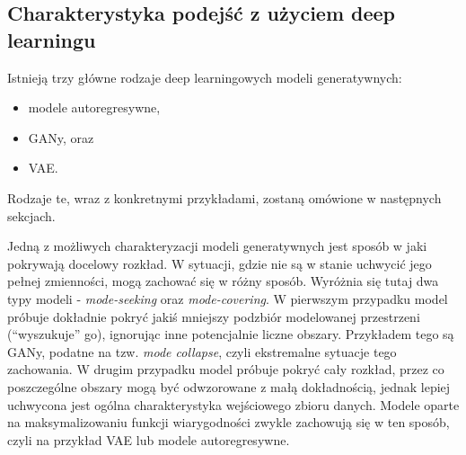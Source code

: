 \documentclass[magisterska]{pracamgr}
\begin{document}
\subsection{Charakterystyka podejść z użyciem deep learningu}

Istnieją trzy główne rodzaje deep learningowych modeli generatywnych:
\begin{itemize}
    \setlength\itemsep{0em}
    \item modele autoregresywne,
    \item GANy, oraz
    \item VAE.
\end{itemize}
Rodzaje te, wraz z konkretnymi przykładami, zostaną omówione w następnych sekcjach.


Jedną z możliwych charakteryzacji modeli generatywnych jest sposób w jaki pokrywają docelowy rozkład. W sytuacji, gdzie nie są w stanie uchwycić jego pełnej zmienności, mogą zachować się w różny sposób. Wyróżnia się tutaj dwa typy modeli - \emph{mode-seeking} oraz \emph{mode-covering}. W pierwszym przypadku model próbuje dokładnie pokryć jakiś mniejszy podzbiór modelowanej przestrzeni ("`wyszukuje"' go), ignorując inne potencjalnie liczne obszary. Przykładem tego są GANy, podatne na tzw. \emph{mode collapse}, czyli ekstremalne sytuacje tego zachowania. W drugim przypadku model próbuje pokryć cały rozkład, przez co poszczególne obszary mogą być odwzorowane z małą dokładnością, jednak lepiej uchwycona jest ogólna charakterystyka wejściowego zbioru danych. Modele oparte na maksymalizowaniu funkcji wiarygodności zwykle zachowują się w ten sposób, czyli na przykład VAE lub modele autoregresywne.
\end{document}
